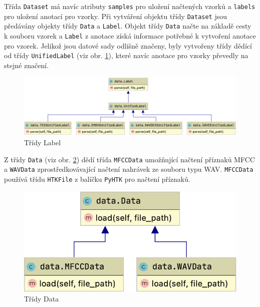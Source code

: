 \documentclass[FM,BP]{tulthesis}
\begin{document}
Třída \texttt{\mbox{Dataset}} má navíc atributy \texttt{\mbox{samples}} pro uložení načtených vzorků a \texttt{\mbox{labels}} pro uložení anotací pro vzorky. Při vytváření objektu třídy \texttt{\mbox{Dataset}} jsou předávány objekty třídy \texttt{\mbox{Data}} a \texttt{\mbox{Label}}. Objekt třídy \texttt{\mbox{Data}} načte na základě cesty k souboru vzorek a \texttt{\mbox{Label}} z anotace získá informace potřebné k vytvoření anotace pro vzorek. Jelikož jsou datové sady odlišně značeny, byly vytvořeny třídy dědící od třídy \texttt{\mbox{UnifiedLabel}} (viz obr. \mbox{\ref{fig:label}}), které navíc anotace pro vzorky převedly na stejné značení.

\begin{figure}[ht]
\centerline{\includegraphics[scale=.23,keepaspectratio]{data-label.png}}
\caption{Třídy Label}
\label{fig:label}
\end{figure}
\FloatBarrier

Z třídy \texttt{\mbox{Data}} (viz obr. \mbox{\ref{fig:data}}) dědí třída \texttt{\mbox{MFCCData}} umožňující načtení příznaků MFCC a \texttt{\mbox{WAVData}} zprostředkovávající načtení nahrávek ze souboru typu WAV. \texttt{\mbox{MFCCData}} používá třídu \texttt{\mbox{HTKFile}} z balíčku \texttt{\mbox{PyHTK}} pro načtení příznaků.

\begin{figure}[ht]
\centerline{\includegraphics[scale=.25,keepaspectratio]{data-data.png}}
\caption{Třídy Data}
\label{fig:data}
\end{figure}
\FloatBarrier
\end{document}
